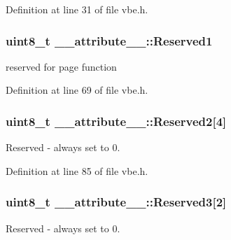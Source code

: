 Definition at line 31 of file vbe.\+h.

\hypertarget{struct____attribute_____a8ace2dfe4814abc401442986ac8a5356}{}
\subsubsection[{Reserved1}]{\setlength{\rightskip}{0pt plus 5cm}uint8\+\_\+t \+\_\+\+\_\+attribute\+\_\+\+\_\+\+::\+Reserved1}\label{struct____attribute_____a8ace2dfe4814abc401442986ac8a5356}


reserved for page function 



Definition at line 69 of file vbe.\+h.

\hypertarget{struct____attribute_____a534ebf7a2bdad17747cfc9cb6cc50c5c}{}
\subsubsection[{Reserved2}]{\setlength{\rightskip}{0pt plus 5cm}uint8\+\_\+t \+\_\+\+\_\+attribute\+\_\+\+\_\+\+::\+Reserved2\mbox{[}4\mbox{]}}\label{struct____attribute_____a534ebf7a2bdad17747cfc9cb6cc50c5c}


Reserved -\/ always set to 0. 



Definition at line 85 of file vbe.\+h.

\hypertarget{struct____attribute_____a9336499af9094522dbe1bfd4d43934a1}{}
\subsubsection[{Reserved3}]{\setlength{\rightskip}{0pt plus 5cm}uint8\+\_\+t \+\_\+\+\_\+attribute\+\_\+\+\_\+\+::\+Reserved3\mbox{[}2\mbox{]}}\label{struct____attribute_____a9336499af9094522dbe1bfd4d43934a1}


Reserved -\/ always set to 0. 



